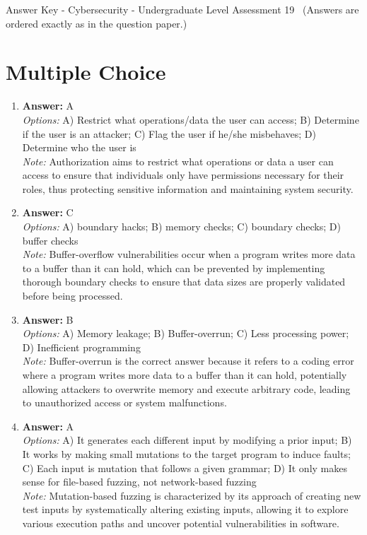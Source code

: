 \documentclass[12pt]{article}
\begin{document}
\begin{center}
Answer Key - Cybersecurity - Undergraduate Level Assessment 19 \
\small (Answers are ordered exactly as in the question paper.)
\end{center}

\section*{Multiple Choice}
\begin{enumerate}[label=\arabic*.]
\item \textbf{Answer:} A
\\ \textit{Options:} A) Restrict what operations/data the user can access; B) Determine if the user is an attacker; C) Flag the user if he/she misbehaves; D) Determine who the user is
\\ \textit{Note:} Authorization aims to restrict what operations or data a user can access to ensure that individuals only have permissions necessary for their roles, thus protecting sensitive information and maintaining system security.
\item \textbf{Answer:} C
\\ \textit{Options:} A) boundary hacks; B) memory checks; C) boundary checks; D) buffer checks
\\ \textit{Note:} Buffer-overflow vulnerabilities occur when a program writes more data to a buffer than it can hold, which can be prevented by implementing thorough boundary checks to ensure that data sizes are properly validated before being processed.
\item \textbf{Answer:} B
\\ \textit{Options:} A) Memory leakage; B) Buffer-overrun; C) Less processing power; D) Inefficient programming
\\ \textit{Note:} Buffer-overrun is the correct answer because it refers to a coding error where a program writes more data to a buffer than it can hold, potentially allowing attackers to overwrite memory and execute arbitrary code, leading to unauthorized access or system malfunctions.
\item \textbf{Answer:} A
\\ \textit{Options:} A) It generates each different input by modifying a prior input; B) It works by making small mutations to the target program to induce faults; C) Each input is mutation that follows a given grammar; D) It only makes sense for file-based fuzzing, not network-based fuzzing
\\ \textit{Note:} Mutation-based fuzzing is characterized by its approach of creating new test inputs by systematically altering existing inputs, allowing it to explore various execution paths and uncover potential vulnerabilities in software.

\end{enumerate}
\end{document}
